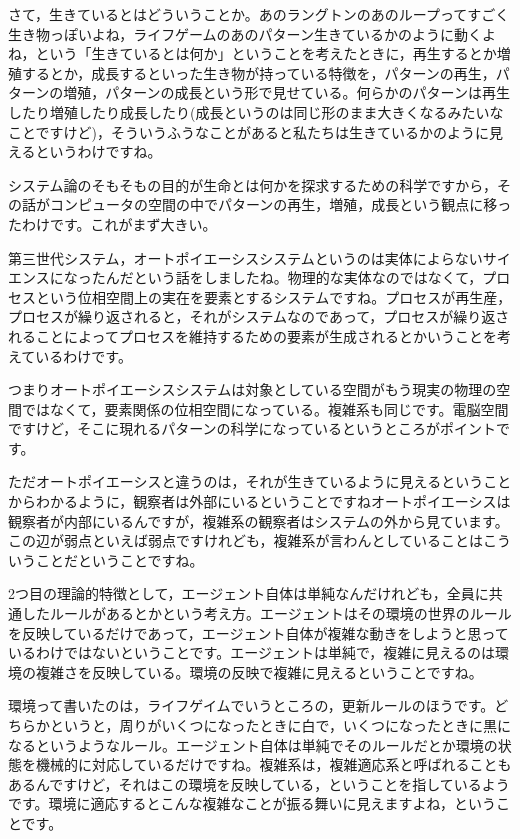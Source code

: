 \documentclass{ltjsbook}
\begin{document}
さて，生きているとはどういうことか。あのラングトンのあのループってすごく生き物っぽいよね，ライフゲームのあのパターン生きているかのように動くよね，という「生きているとは何か」ということを考えたときに，再生するとか増殖するとか，成長するといった生き物が持っている特徴を，パターンの再生，パターンの増殖，パターンの成長という形で見せている。何らかのパターンは再生したり増殖したり成長したり(成長というのは同じ形のまま大きくなるみたいなことですけど)，そういうふうなことがあると私たちは生きているかのように見えるというわけですね。

システム論のそもそもの目的が生命とは何かを探求するための科学ですから，その話がコンピュータの空間の中でパターンの再生，増殖，成長という観点に移ったわけです。これがまず大きい。

第三世代システム，オートポイエーシスシステムというのは実体によらないサイエンスになったんだという話をしましたね。物理的な実体なのではなくて，プロセスという位相空間上の実在を要素とするシステムですね。プロセスが再生産，プロセスが繰り返されると，それがシステムなのであって，プロセスが繰り返されることによってプロセスを維持するための要素が生成されるとかいうことを考えているわけです。

つまりオートポイエーシスシステムは対象としている空間がもう現実の物理の空間ではなくて，要素関係の位相空間になっている。複雑系も同じです。電脳空間ですけど，そこに現れるパターンの科学になっているというところがポイントです。

ただオートポイエーシスと違うのは，それが生きているように見えるということからわかるように，観察者は外部にいるということですねオートポイエーシスは観察者が内部にいるんですが，複雑系の観察者はシステムの外から見ています。この辺が弱点といえば弱点ですけれども，複雑系が言わんとしていることはこういうことだということですね。

2つ目の理論的特徴として，エージェント自体は単純なんだけれども，全員に共通したルールがあるとかという考え方。エージェントはその環境の世界のルールを反映しているだけであって，エージェント自体が複雑な動きをしようと思っているわけではないということです。エージェントは単純で，複雑に見えるのは環境の複雑さを反映している。環境の反映で複雑に見えるということですね。

環境って書いたのは，ライフゲイムでいうところの，更新ルールのほうです。どちらかというと，周りがいくつになったときに白で，いくつになったときに黒になるというようなルール。エージェント自体は単純でそのルールだとか環境の状態を機械的に対応しているだけですね。複雑系は，複雑適応系と呼ばれることもあるんですけど，それはこの環境を反映している，ということを指しているようです。環境に適応するとこんな複雑なことが振る舞いに見えますよね，ということです。
\end{document}

